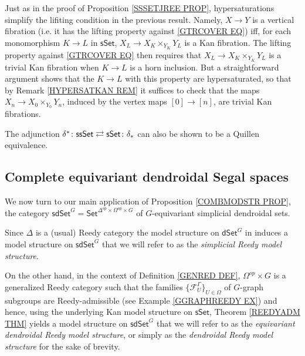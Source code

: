\documentclass[a4paper,10pt
,draft
]{article}%
\begin{document}
\begin{remark}\label{HYPERSIMPL REM}
	Just as in the proof of Proposition \ref{SSSETJREE PROP}, hypersaturations simplify the lifiting condition
	in the previous result. 
	Namely,	$X \to Y$ is a vertical fibration (i.e. it has the lifting property against \eqref{GTRCOVER EQ})
	iff, for each monomorphism $K \to L$ in $\mathsf{sSet}$,
	$X_L \to X_K \times_{Y_K} Y_L$
	is a Kan fibration.
	The lifting property against \eqref{GTRCOVER EQ}
	then requires that 
	$X_L \to X_K \times_{Y_K} Y_L$ is a trivial Kan fibration
	when $K \to L$ is a horn inclusion. 
	But a straightforward argument shows that the $K \to L$ with this property are hypersaturated,
	so that by 
Remark \ref{HYPERSATKAN REM} it suffices to check that the maps $X_n \to X_0 \times_{Y_0} Y_n$, induced by the vertex maps $[0] \to [n]$, are trivial Kan fibrations.
\end{remark}


\begin{remark}
The adjunction 
$
	\delta^{\**}\colon \mathsf{ssSet}
		\rightleftarrows 
	\mathsf{sSet} \colon \delta_{\**}
$
can also be shown to be a Quillen equivalence.
\end{remark}


\subsection{Complete equivariant dendroidal Segal spaces}
\label{CEDSS SEC}


We now turn to our main application of Proposition \ref{COMBMODSTR PROP}, the category 
$\mathsf{sdSet}^G = \mathsf{Set}^{\Delta^{op} \times \Omega^{op} \times G}$
of $G$-equivariant simplicial dendroidal sets.

Since $\Delta$ is a (usual) Reedy category the model structure on $\mathsf{dSet}^G$ 
in \cite[Thm. 2.1]{Per18} induces 
a model structure on $\mathsf{sdSet}^G$
that we will refer to as the \textit{simplicial Reedy model structure}.

On the other hand, in the context of Definition \ref{GENRED DEF},
$\Omega^{op} \times G$ is a generalized Reedy category such that the families $\{\mathcal{F}_{U}^{\Gamma}\}_{U \in \Omega}$
of $G$-graph subgroups are Reedy-admissible 
(see Example \ref{GGRAPHREEDY EX})
and hence, using the underlying 
Kan model structure on $\mathsf{sSet}$, 
Theorem \ref{REEDYADM THM} yields
a model structure on $\mathsf{sdSet}^G$
that we will refer to as the \textit{equivariant dendroidal Reedy model structure}, 
or simply as the \textit{dendroidal Reedy model structure} for the sake of brevity.
\end{document}
